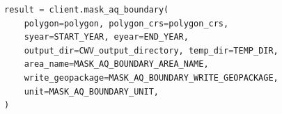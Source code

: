 \begin{lstlisting}[language=Python,caption={Example call of \script{mask\_aq\_boundary}.}]
result = client.mask_aq_boundary(
    polygon=polygon, polygon_crs=polygon_crs,
    syear=START_YEAR, eyear=END_YEAR,
    output_dir=CWV_output_directory, temp_dir=TEMP_DIR,
    area_name=MASK_AQ_BOUNDARY_AREA_NAME,
    write_geopackage=MASK_AQ_BOUNDARY_WRITE_GEOPACKAGE,
    unit=MASK_AQ_BOUNDARY_UNIT,
)
\end{lstlisting}

